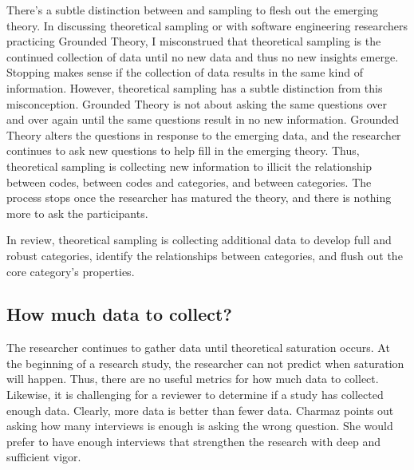 There's a subtle distinction between  and sampling to flesh out the emerging theory. In discussing theoretical sampling or  with software engineering researchers practicing Grounded Theory, I misconstrued that theoretical sampling is the continued collection of data until no new data and thus no new insights emerge. Stopping makes sense if the collection of data results in the same kind of information. However, theoretical sampling has a subtle distinction from this misconception. Grounded Theory is not about asking the same questions over and over again until the same questions result in no new information. Grounded Theory alters the questions in response to the emerging data, and the researcher continues to ask new questions to help fill in the emerging theory. Thus, theoretical sampling is collecting new information to illicit the relationship between codes, between codes and categories, and between categories. The process stops once the researcher has matured the theory, and there is nothing more to ask the participants. 



In review, theoretical sampling is collecting additional data to develop full and robust categories, identify the relationships between categories, and flush out the core category's properties.

\subsection{How much data to collect?}
The researcher continues to gather data until theoretical saturation occurs. At the beginning of a research study, the researcher can not predict when saturation will happen. Thus, there are no useful metrics for how much data to collect. Likewise, it is challenging for a reviewer to determine if a study has collected enough data. Clearly, more data is better than fewer data. Charmaz points out asking how many interviews is enough is asking the wrong question. She would prefer to have enough interviews that strengthen the research with deep and sufficient vigor. 

